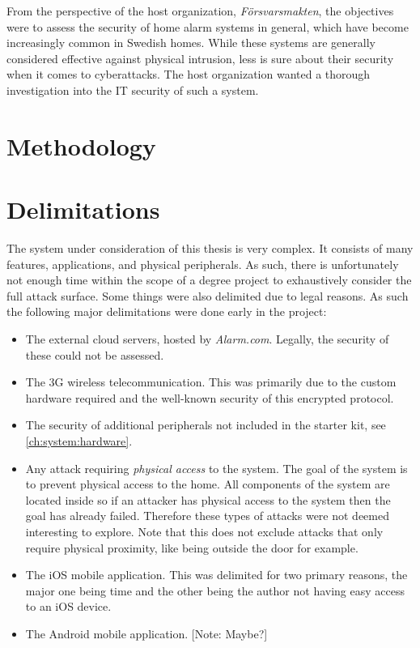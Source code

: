 From the perspective of the host organization, \textit{Försvarsmakten}, the objectives were to assess the security of home alarm systems in general, which have become increasingly common in Swedish homes. While these systems are generally considered effective against physical intrusion, less is sure about their security when it comes to cyberattacks. The host organization wanted a thorough investigation into the IT security of such a system.

\section{Methodology} \label{ch:intro:methodology}
\todo

\section{Delimitations} \label{ch:intro:delimitations}
The system under consideration of this thesis is very complex. It consists of many features, applications, and physical peripherals. As such, there is unfortunately not enough time within the scope of a degree project to exhaustively consider the full attack surface. Some things were also delimited due to legal reasons. As such the following major delimitations were done early in the project:

\begin{itemize}
    \item The external cloud servers, hosted by \textit{Alarm.com}. Legally, the security of these could not be assessed.
    \item The 3G wireless telecommunication. This was primarily due to the custom hardware required and the well-known security of this encrypted protocol.
    \item The security of additional peripherals not included in the starter kit, see \ref{ch:system:hardware}.
    \item Any attack requiring \textit{physical access} to the system. The goal of the system is to prevent physical access to the home. All components of the system are located inside so if an attacker has physical access to the system then the goal has already failed. Therefore these types of attacks were not deemed interesting to explore. Note that this does not exclude attacks that only require physical proximity, like being outside the door for example.
    \item The iOS mobile application. This was delimited for two primary reasons, the major one being time and the other being the author not having easy access to an iOS device.
    \item The Android mobile application. [Note: Maybe?]
\end{itemize}

